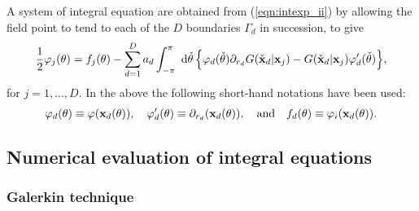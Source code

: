 \documentclass[12pt,a4paper]{article}
\newcommand{\vph}{{\varphi}}
\newcommand{\vpr}{{\varphi}}
\newcommand{\bdy}{\Gamma}
\newcommand{\rad}{a}
\newcommand{\xo}{\check{x}}
\newcommand{\yo}{\check{y}}
\newcommand{\bx}{{\bf x}}
\newcommand{\bxo}{\check{\textbf{x}}}
\newcommand{\tho}{\check{\theta}}
\newcommand{\force}{f}
\begin{document}
A system of integral equation are obtained from (\ref{eqn:intexp_ii}) by allowing the field point to tend to each of the $D$ boundaries $\bdy_{d}$ in succession, to give
\begin{equation}\label{eqn:IEsys}
\frac12
\vpr_{j}(\theta)
=
\force_{j}(\theta)
-
\sum_{d=1}^{D}
\rad_{d}
\int_{-\pi}^{\pi}
\wrt \tho\,
\Big\{
\vpr_{d}(\tho)
\partial_{r_{d}}
G(\bxo_{d}\vert \bx_{j})
-
G(\bxo_{d}\vert \bx_{j})
\vpr'_{d}(\tho)
\Big\}
,
\end{equation}
for $j=1,\dots,D$.
In the above the following short-hand notations have been used:
\begin{equation}
\vpr_{d}(\theta) \equiv \vph(\bx_{d}(\theta)),
\quad
\vpr'_{d}(\theta) \equiv \partial_{r_{d}}(\bx_{d}(\theta)),
\quad
\text{and}
\quad
\force_{d}(\theta) \equiv \vph_{i}(\bx_{d}(\theta)).
\end{equation}


\subsection{Numerical evaluation of integral equations}


\subsubsection{Galerkin technique}
\end{document}
